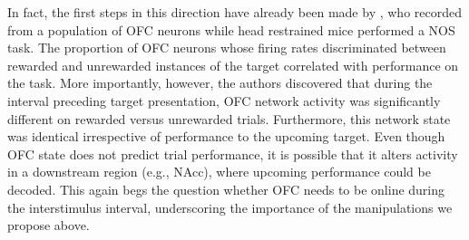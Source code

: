 \documentclass[11pt]{article}
\let\citeN=\citet
\begin{document}
In fact, the first steps in this direction have already been made by 
\citeN{Shobe2017}, who recorded from a population of OFC neurons while head 
restrained mice performed a NOS task. The proportion of OFC neurons whose 
firing rates discriminated between rewarded and unrewarded instances of the 
target correlated with performance on the task. More importantly, however, the 
authors discovered that during the interval preceding target presentation, OFC 
network activity was significantly different on rewarded versus unrewarded 
trials. Furthermore, this network state was identical irrespective of 
performance to the upcoming target. Even though OFC state does not predict 
trial performance, it is possible that it alters activity in a downstream 
region (e.g., NAcc), where upcoming performance could be decoded. This again 
begs the question whether OFC needs to be online during the interstimulus 
interval, underscoring the importance of the manipulations we propose above. 

{}
\end{document}
